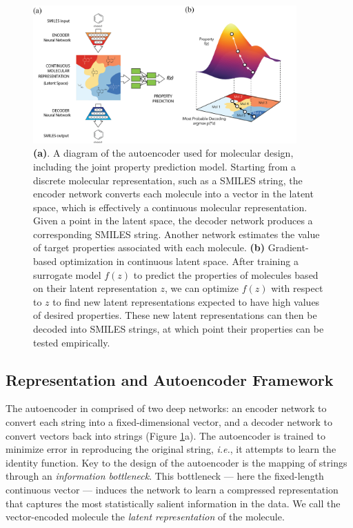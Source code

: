 \begin{figure}
\begin{center}
\includegraphics[width=0.90\textwidth]{fig1.png}
\caption[Overview of Variational Autoencoder]{\textbf{(a)}. A diagram of the autoencoder used for molecular design, including the joint property prediction model.
Starting from a discrete molecular representation, such as a SMILES string, the encoder network converts each molecule into a vector in the latent space, which is effectively a continuous molecular representation. Given a point in the latent space, the decoder network produces a corresponding SMILES string. Another network estimates the value of target properties associated with each molecule.
\textbf{(b)} Gradient-based optimization in continuous latent space.
After training a surrogate model $f(z)$ to predict the properties of molecules based on their latent representation $z$, we can optimize $f(z)$ with respect to $z$ to find new latent representations expected to have high values of desired properties.
These new latent representations can then be decoded into SMILES strings, at which point their properties can be tested empirically.}
\label{fig:ae_opt_diagrams}
\end{center}
\end{figure}

\subsection{Representation and Autoencoder Framework}
The autoencoder in comprised of two deep networks: an encoder network to convert each string into a fixed-dimensional vector,
and a decoder network to convert vectors back into strings (Figure \ref{fig:ae_opt_diagrams}a).
The autoencoder is trained to minimize error in reproducing the original string, \textit{i.e.}, it attempts to learn the identity function.
Key to the design of the autoencoder is the mapping of strings through an \emph{information bottleneck}.
This bottleneck --- here the fixed-length continuous vector --- induces the network to learn a compressed representation that captures the most statistically salient information in the data.
We call the vector-encoded molecule the \emph{latent representation} of the molecule.

